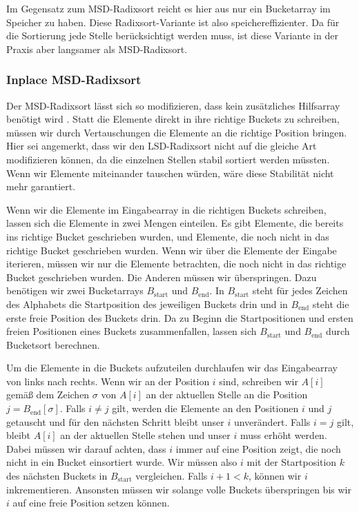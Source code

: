 Im Gegensatz zum MSD-Radixsort reicht es hier aus nur ein Bucketarray im Speicher zu haben.
Diese Radixsort-Variante ist also speichereffizienter.
Da für die Sortierung jede Stelle berücksichtigt werden muss,
ist diese Variante in der Praxis aber langsamer als MSD-Radixsort.

\subsubsection{Inplace MSD-Radixsort}
\label{sort:radix:inplace}

Der MSD-Radixsort lässt sich so modifizieren, dass kein zusätzliches Hilfsarray benötigt wird \cite{radixsort:inplace}.
Statt die Elemente direkt in ihre richtige Buckets zu schreiben,
müssen wir durch Vertauschungen die Elemente an die richtige Position bringen.
Hier sei angemerkt, dass wir den LSD-Radixsort nicht auf die gleiche Art modifizieren können,
da die einzelnen Stellen stabil sortiert werden müssten.
Wenn wir Elemente miteinander tauschen würden, wäre diese Stabilität nicht mehr garantiert.

Wenn wir die Elemente im Eingabearray in die richtigen Buckets schreiben,
lassen sich die Elemente in zwei Mengen einteilen.
Es gibt Elemente, die bereits ins richtige Bucket geschrieben wurden,
und Elemente, die noch nicht in das richtige Bucket geschrieben wurden.
Wenn wir über die Elemente der Eingabe iterieren, müssen wir nur die Elemente betrachten,
die noch nicht in das richtige Bucket geschrieben wurden.
Die Anderen müssen wir überspringen.
Dazu benötigen wir zwei Bucketarrays $B_{\text{start}}$ und $B_{\text{end}}$.
In $B_{\text{start}}$ steht für jedes Zeichen des Alphabets die Startposition des jeweiligen Buckets drin
und in $B_{\text{end}}$ steht die erste freie Position des Buckets drin.
Da zu Beginn die Startpositionen und ersten freien Positionen eines Buckets zusammenfallen,
lassen sich $B_{\text{start}}$ und $B_{\text{end}}$ durch Bucketsort berechnen.

Um die Elemente in die Buckets aufzuteilen durchlaufen wir das Eingabearray von links nach rechts.
Wenn wir an der Position $i$ sind, schreiben wir $A[i]$ gemäß dem Zeichen $\sigma$ von $A[i]$ an der
aktuellen Stelle an die Position $j = B_{\text{end}}[\sigma]$.
Falls $i \ne j$ gilt, werden die Elemente an den Positionen $i$ und $j$ getauscht
und für den nächsten Schritt bleibt unser $i$ unverändert.
Falls $i = j$ gilt, bleibt $A[i]$ an der aktuellen Stelle stehen und unser $i$ muss erhöht werden.
Dabei müssen wir darauf achten, dass $i$ immer auf eine Position zeigt,
die noch nicht in ein Bucket einsortiert wurde.
Wir müssen also $i$ mit der Startposition $k$ des nächsten Buckets in $B_{\text{start}}$ vergleichen.
Falls $i+1 < k$, können wir $i$ inkrementieren.
Ansonsten müssen wir solange volle Buckets überspringen bis wir $i$ auf eine freie Position setzen können.

